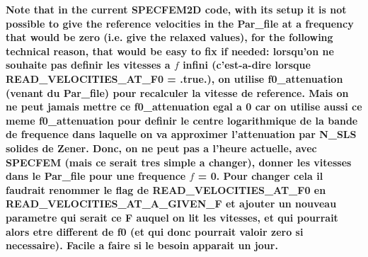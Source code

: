 \documentclass[a4paper,12pt]{article}
\begin{document}
\textbf{Note that in the current SPECFEM2D code, with its setup it is not possible to give the reference velocities in the Par\_file at a frequency that would be zero
(i.e. give the relaxed values), for the following technical reason, that would be easy to fix if needed:
lorsqu'on ne souhaite pas definir les vitesses a $f$ infini (c'est-a-dire lorsque READ\_VELOCITIES\_AT\_F0 = .true.), on utilise f0\_attenuation (venant du Par\_file)
pour recalculer la vitesse de reference. Mais on ne peut jamais mettre ce f0\_attenuation egal a 0 car on utilise aussi ce meme f0\_attenuation pour
definir le centre logarithmique de la bande de frequence dans laquelle on va approximer l'attenuation par N\_SLS solides de Zener.
Donc, on ne peut pas a l'heure actuelle, avec SPECFEM (mais ce serait tres simple a changer), donner les vitesses dans le Par\_file pour une frequence $f$ = 0.
Pour changer cela il faudrait renommer le flag de READ\_VELOCITIES\_AT\_F0 en\\
READ\_VELOCITIES\_AT\_A\_GIVEN\_F et ajouter un nouveau parametre qui serait ce F auquel on lit les vitesses,
et qui pourrait alors etre different de f0 (et qui donc pourrait valoir zero si necessaire).
Facile a faire si le besoin apparait un jour.}


\end{document}
